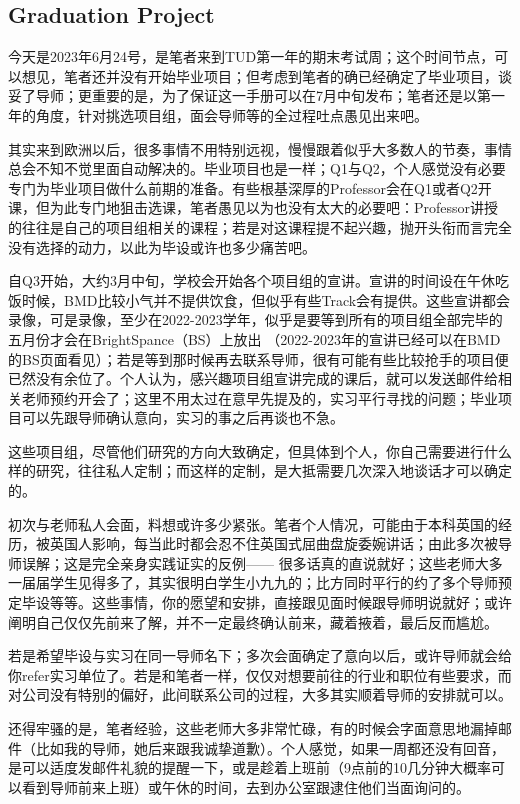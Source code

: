 \subsection{Graduation Project}

今天是2023年6月24号，是笔者来到TUD第一年的期末考试周；这个时间节点，可以想见，笔者还并没有开始毕业项目；但考虑到笔者的确已经确定了毕业项目，谈妥了导师；更重要的是，为了保证这一手册可以在7月中旬发布；笔者还是以第一年的角度，针对挑选项目组，面会导师等的全过程吐点愚见出来吧。

其实来到欧洲以后，很多事情不用特别远视，慢慢跟着似乎大多数人的节奏，事情总会不知不觉里面自动解决的。毕业项目也是一样；Q1与Q2，个人感觉没有必要专门为毕业项目做什么前期的准备。有些根基深厚的Professor会在Q1或者Q2开课，但为此专门地狙击选课，笔者愚见以为也没有太大的必要吧：Professor讲授的往往是自己的项目组相关的课程；若是对这课程提不起兴趣，抛开头衔而言完全没有选择的动力，以此为毕设或许也多少痛苦吧。

自Q3开始，大约3月中旬，学校会开始各个项目组的宣讲。宣讲的时间设在午休吃饭时候，BMD比较小气并不提供饮食，但似乎有些Track会有提供。这些宣讲都会录像，可是录像，至少在2022-2023学年，似乎是要等到所有的项目组全部完毕的五月份才会在BrightSpance（BS）上放出 （2022-2023年的宣讲已经可以在BMD的BS页面看见）；若是等到那时候再去联系导师，很有可能有些比较抢手的项目便已然没有余位了。个人认为，感兴趣项目组宣讲完成的课后，就可以发送邮件给相关老师预约开会了；这里不用太过在意早先提及的，实习平行寻找的问题；毕业项目可以先跟导师确认意向，实习的事之后再谈也不急。

这些项目组，尽管他们研究的方向大致确定，但具体到个人，你自己需要进行什么样的研究，往往私人定制；而这样的定制，是大抵需要几次深入地谈话才可以确定的。

初次与老师私人会面，料想或许多少紧张。笔者个人情况，可能由于本科英国的经历，被英国人影响，每当此时都会忍不住英国式屈曲盘旋委婉讲话；由此多次被导师误解；这是完全亲身实践证实的反例—— 很多话真的直说就好；这些老师大多一届届学生见得多了，其实很明白学生小九九的；比方同时平行的约了多个导师预定毕设等等。这些事情，你的愿望和安排，直接跟见面时候跟导师明说就好；或许阐明自己仅仅先前来了解，并不一定最终确认前来，藏着掖着，最后反而尴尬。

若是希望毕设与实习在同一导师名下；多次会面确定了意向以后，或许导师就会给你refer实习单位了。若是和笔者一样，仅仅对想要前往的行业和职位有些要求，而对公司没有特别的偏好，此间联系公司的过程，大多其实顺着导师的安排就可以。

还得牢骚的是，笔者经验，这些老师大多非常忙碌，有的时候会字面意思地漏掉邮件（比如我的导师，她后来跟我诚挚道歉）。个人感觉，如果一周都还没有回音，是可以适度发邮件礼貌的提醒一下，或是趁着上班前（9点前的10几分钟大概率可以看到导师前来上班）或午休的时间，去到办公室跟逮住他们当面询问的。

